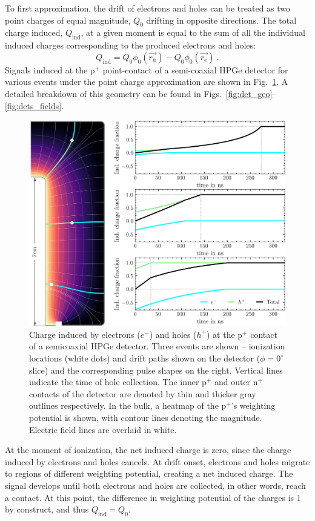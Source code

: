 To first approximation, the drift of electrons and holes can be treated as two point charges of equal magnitude, $Q_0$ drifting in opposite directions. The total charge induced, $Q_\text{ind}$, at a given moment is equal to the sum of all the individual induced charges corresponding to the produced electrons and holes:
\begin{equation}
	Q_\text{ind} = Q_0\phi_0(\vec{r_h}) - Q_0\phi_0(\vec{r_e})~.
	\label{eq:charge_ind_point}
\end{equation}
Signals induced at the p$^+$ point-contact of a semi-coaxial HPGe detector for various events under the point charge approximation are shown in Fig.~\ref{fig:coax_sigs}. A detailed breakdown of this geometry can be found in Figs.~\ref{fig:det_geo}--\ref{fig:dets_fields}. 
\begin{figure}[htb]
	\centering
	\includegraphics[width=6in]{figs/ge/coax_sigs.png}
	\caption{Charge induced by electrons ($e^-$) and holes ($h^+$) at the p$^+$ contact of a semicoaxial HPGe detector. Three events are shown -- ionization locations (white dots) and drift paths shown on the detector ($\phi = 0^\circ$ slice) and the corresponding pulse shapes on the right. Vertical lines indicate the time of hole collection. The inner p$^+$ and outer n$^+$ contacts of the detector are denoted by thin and thicker gray outlines respectively. In the bulk, a heatmap of the p$^+$'s weighting potential is shown, with contour lines denoting the magnitude. Electric field lines are overlaid in white.}
	\label{fig:coax_sigs}
\end{figure}
At the moment of ionization, the net induced charge is zero, since the charge induced by electrons and holes cancels. At drift onset, electrons and holes migrate to regions of different weighting potential, creating a net induced charge. The signal develops until both electrons and holes are collected, in other words, reach a contact. At this point, the difference in weighting potential of the charges is 1 by construct, and thus $Q_\text{ind} = Q_0$.

